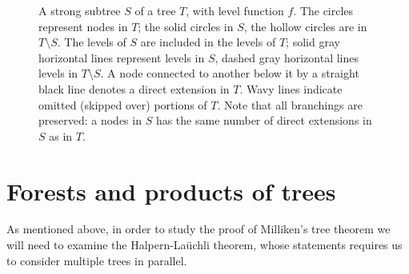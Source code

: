 \begin{figure}[htbp]
  	\caption{A strong subtree $S$ of a tree $T$, with level function $f$. The circles represent nodes in $T$; the solid circles in $S$, the hollow circles are in $T \setminus S$. The levels of $S$ are included in the level{s} of $T$; solid gray horizontal lines represent levels in $S$, dashed gray horizontal lines levels in $T \setminus S$. A node connected to another below it by a straight black line denotes a direct extension in $T$. Wavy lines indicate omitted (skipped over) portions of $T$. Note that all branchings are preserved: a nodes in $S$ has the same number of direct extensions in $S$ as in $T$.}
  	\label{fig:strong-subtree}
\end{figure}

\section{Forests and products of trees}\label{sec:bkg_forests}

As mentioned above, in order to study the proof of Milliken's tree theorem we will need to examine the Halpern-La\"{u}chli theorem, whose statements requires us to consider multiple trees in parallel.

